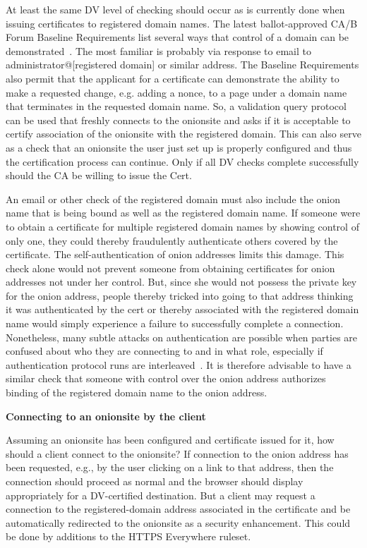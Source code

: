 \documentclass[10pt]{styles/IEEEtran}
\newcommand{\point}[1]{\vspace{2mm} \noindent\textbf{#1}}
\begin{document}
At least the same DV level of checking should occur as is currently
done when issuing certificates to registered domain names. The latest
ballot-approved CA/B Forum Baseline Requirements list several ways
that control of a domain can be demonstrated~\cite{cabforum-br}.  The
most familiar is probably via response to email to
administrator@[registered domain] or similar address.
The Baseline Requirements also permit
that the applicant for a certificate can demonstrate the ability
to make a requested change, e.g. adding a nonce, to a
page under a domain name that terminates in the requested domain name. 
So, a  validation query protocol can be used
that freshly connects to the onionsite and asks if it is acceptable to
certify association of the onionsite with the registered domain.  This
can also serve as a check that an onionsite the user just set up is
properly configured and thus the certification process can continue.
Only if all DV checks complete successfully should the CA be willing
to issue the Cert.


An email or other check of the registered domain must also include the
onion name that is being bound as well as the registered domain name.
If someone were to obtain a certificate for multiple registered domain
names by showing control of only one, they could thereby fraudulently
authenticate others covered by the certificate. The
self-authentication of onion addresses limits this damage.  This check
alone would not prevent someone from obtaining certificates for onion
addresses not under her control. But, since she would not possess the
private key for the onion address, people thereby tricked into going
to that address thinking it was authenticated by the cert or thereby
associated with the registered domain name would simply experience a
failure to successfully complete a connection. Nonetheless, many
subtle attacks on authentication are possible when parties are
confused about who they are connecting to and in what role, especially
if authentication protocol runs are interleaved~\cite{fosad00}.  It is
therefore advisable to have a similar check that someone with control
over the onion address authorizes binding of the registered domain
name to the onion address.


\point{Connecting to an onionsite by the client}

Assuming an onionsite has been configured and certificate issued for
it, how should a client connect to the onionsite? If connection
to the onion address has been requested, e.g., by the user
clicking on a link to that address, then the connection should
proceed as normal and the browser should display appropriately for a
DV-certified destination. But a client may request a connection
to the registered-domain address associated in the certificate
and be automatically redirected to the onionsite as a security
enhancement. This could be done by additions to the HTTPS Everywhere
ruleset.
\end{document}
